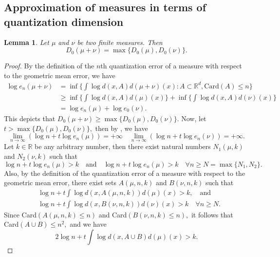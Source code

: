 \documentclass{amsproc}
\newtheorem{lemma}[theorem]{Lemma}
\theoremstyle{definition}
\theoremstyle{remark}
\numberwithin{equation}{section}
\begin{document}
  \subsection{Approximation of measures in terms of quantization dimension}
 \begin{lemma}\label{lem10}
     Let $\mu$ and $\nu$ be two finite measures. Then 
     $$D_{0}(\mu +\nu) = \max\{D_{0}(\mu) , D_{0}(\nu)\}.$$
 \end{lemma}
 \begin{proof}
     By the definition of the $n$th quantization error of a measure with respect to the geometric mean error, we have 
     \begin{equation}
      \begin{aligned}
          \log e_{n}(\mu+\nu) &= \inf \bigg\{ \int \log d(x,A) d(\mu+\nu)(x) : A \subset \mathbb{R}^d, \text{Card}(A) \le n\bigg\} \\& \ge 
\inf \bigg\{ \int \log d(x,A) d(\mu)(x)\bigg\} + \inf \bigg\{ \int \log d(x,A) d(\nu)(x)\bigg\} \\& = \log e_n(\mu) + \log e_{0}(\nu).
  \end{aligned}   
     \end{equation}
     This depicts that $D_{0}(\mu + \nu) \ge \max\{D_{0}(\mu), D_{0}(\nu)\}.$ Now, let $t > \max\{D_{0}(\mu), D_{0}(\nu)\},$ then by \cite[Proposition 4.3]{GL3}, we have 
     $$\lim_{n \to \infty}(\log n + t \log e_{n}(\mu)) = +\infty \quad \lim_{n \to \infty}(\log n + t \log e_{n}(\nu)) = +\infty.$$
     Let $k \in \mathbb{R}$ be any arbitrary number, then there exist natural numbers $N_1(\mu,k)$ and $N_2(\nu,k)$ such that 
     $$\log n  + t \log e_{n}(\mu) > k \quad \text{and} \quad \log n  + t \log e_{n}(\mu) > k \quad \forall n \ge N = \max\{N_1,N_2\}.$$
     Also, by the definition of the quantization error of a measure with respect to the geometric mean error, there exist sets $A(\mu,n,k)$ and $B(\nu,n,k)$ such that 
     \begin{equation*}
         \begin{aligned}
            &\log n  + t  \int \log d(x,A(\mu,n,k)) d(\mu)(x) > k, \quad \text{and} \\& \log n  + t \int \log d(x,B(\nu,n,k)) d(\nu)(x) > k \quad \forall n \ge N. 
         \end{aligned}
     \end{equation*}
  Since Card$(A(\mu,n,k) \le n)$ and Card$(B(\nu,n,k) \le n),$ it follows that Card$(A \cup B) \le n^2,$ and we have $$2 \log n + t \int \log d(x, A\cup B) d (\mu)(x) > k.$$   

\end{proof}
\end{document}
